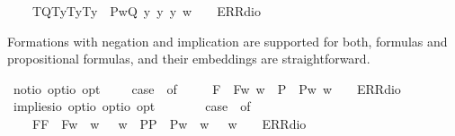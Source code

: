 \begin{isabellebody}
\ \ \ \ {\isacharparenleft}T{\isacharparenleft}Q{\isacharparenright}{\isacharcomma}T{\isacharparenleft}y{}{\isacharparenright}{\isacharcomma}T{\isacharparenleft}y{}{\isacharparenright}{\isacharcomma}T{\isacharparenleft}y{}{\isacharparenright}{\isacharparenright}\ {\isasymRightarrow}\ P{\isacharparenleft}{\isasymlambda}w{\isachardot}{\isacharparenleft}Q\ y{}\ y{}\ y{}{\isacharparenright}\ w{\isacharparenright}\ {\isacharbar}\ {\isacharunderscore}\ {\isasymRightarrow}\ ERR{\isacharparenleft}dio{\isacharparenright}{\isachardoublequoteclose}%
\begin{isamarkuptext}%
Formations with negation and implication are supported for both, formulas  and propositional
 formulas, and their embeddings are straightforward.%
\end{isamarkuptext}%
\isamarkuptrue%
\isamarkupfalse%
\ not{\isacharcolon}{\isacharcolon}{\isachardoublequoteopen}io\ opt{\isasymRightarrow}io\ opt{\isachardoublequoteclose}{\isacharparenleft}{\isachardoublequoteopen}\isactrlbold {\isasymnot}{\isachardoublequoteclose}{\isacharparenright}\ \ {\isachardoublequoteopen}\isactrlbold {\isasymnot}\ {\isasymphi}\ {\isasymequiv}\ case\ {\isasymphi}\ of\ \isanewline
\ \ \ \ F{\isacharparenleft}{\isasympsi}{\isacharparenright}\ {\isasymRightarrow}\ F{\isacharparenleft}{\isasymlambda}w{\isachardot}{\isasymnot}{\isacharparenleft}{\isasympsi}\ w{\isacharparenright}{\isacharparenright}\ {\isacharbar}\ P{\isacharparenleft}{\isasympsi}{\isacharparenright}\ {\isasymRightarrow}\ P{\isacharparenleft}{\isasymlambda}w{\isachardot}{\isasymnot}{\isacharparenleft}{\isasympsi}\ w{\isacharparenright}{\isacharparenright}\ {\isacharbar}\ {\isacharunderscore}\ {\isasymRightarrow}\ ERR{\isacharparenleft}dio{\isacharparenright}{\isachardoublequoteclose}\ \ \isanewline
{}\isamarkupfalse%
\ implies{\isacharcolon}{\isacharcolon}{\isachardoublequoteopen}io\ opt{\isasymRightarrow}io\ opt{\isasymRightarrow}io\ opt{\isachardoublequoteclose}{\isacharparenleft}\ {\isachardoublequoteopen}\isactrlbold {\isasymrightarrow}{\isachardoublequoteclose}\ {}{}{\isacharparenright}\ \ {\isachardoublequoteopen}{\isasymphi}\ \isactrlbold {\isasymrightarrow}\ {\isasympsi}\ {\isasymequiv}\ case\ {\isacharparenleft}{\isasymphi}{\isacharcomma}{\isasympsi}{\isacharparenright}\ of\ \isanewline
\ \ \ \ {\isacharparenleft}F{\isacharparenleft}{\isasymalpha}{\isacharparenright}{\isacharcomma}F{\isacharparenleft}{\isasymbeta}{\isacharparenright}{\isacharparenright}\ {\isasymRightarrow}\ F{\isacharparenleft}{\isasymlambda}w{\isachardot}\ {\isasymalpha}\ w\ {\isasymlongrightarrow}\ {\isasymbeta}\ w{\isacharparenright}\ {\isacharbar}\ {\isacharparenleft}P{\isacharparenleft}{\isasymalpha}{\isacharparenright}{\isacharcomma}P{\isacharparenleft}{\isasymbeta}{\isacharparenright}{\isacharparenright}\ {\isasymRightarrow}\ P{\isacharparenleft}{\isasymlambda}w{\isachardot}\ {\isasymalpha}\ w\ {\isasymlongrightarrow}\ {\isasymbeta}\ w{\isacharparenright}\ {\isacharbar}\ {\isacharunderscore}\ {\isasymRightarrow}\ ERR{\isacharparenleft}dio{\isacharparenright}{\isachardoublequoteclose}%

\end{isabellebody}
